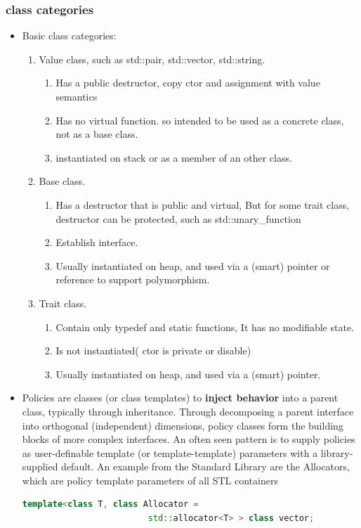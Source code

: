 \documentclass[a4paper,12pt,twoside]{book}
\begin{document}
\subsubsection{class categories}
\begin{itemize}
\item Basic class categories:
\begin{enumerate}
\item Value class, such as std::pair, std::vector, std::string.
\begin{enumerate}
\item Has a public destructor, copy ctor and assignment with value semantics
\item Has no virtual function. so intended to be used as a concrete class, not as a base class.
\item instantiated on stack or as a member of an other class.
\end{enumerate}
\item Base class.
\begin{enumerate}
\item Has a destructor that is public and virtual, But for some trait class, destructor can be protected, such as std::unary\_function
\item Establish interface.
\item Usually instantiated on heap, and used via a (smart) pointer or reference to support polymorphism.
\end{enumerate}

\item Trait class.
\begin{enumerate}
\item Contain only typedef and static functions, It has no modifiable state.
\item Is not instantiated( ctor is private or disable)
\item Usually instantiated on heap, and used via a (smart) pointer.
\end{enumerate}
\end{enumerate}

\item Policies are classes (or class templates) to \textbf{inject behavior} into a parent class, typically through inheritance. Through decomposing a parent interface into orthogonal (independent) dimensions, policy classes form the building blocks of more complex interfaces. An often seen pattern is to supply policies as user-definable template (or template-template) parameters with a library-supplied default. An example from the Standard Library are the Allocators, which are policy template parameters of all STL containers
\begin{lstlisting}[frame=single, language=c++]
template<class T, class Allocator =
                         std::allocator<T> > class vector;
\end{lstlisting}


\end{itemize}
\end{document}
